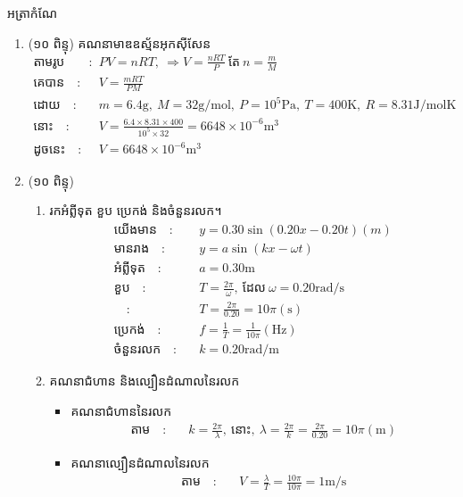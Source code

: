 \documentclass{classes/exam}
\begin{document}
{\kml អត្រាកំណែ}
\begin{enumerate}[I]
	\item {\color{magenta}\ks (១០ ពិន្ទុ)} គណនាមាឌឧស្ម័នអុកសុីសែន
	\begin{align*}
		\text{តាមរូបមន្ត}\quad :&\quad PV=nRT,~\Rightarrow V=\frac{nRT}{P}~\text{តែ}~ n=\frac{m}{M}\\
		\text{គេបាន}\quad :&\quad V=\frac{mRT}{PM}\\
		\text{ដោយ}\quad :&\quad m=6.4\si{\gram},~M=32\si{\gram/\mole},~P=10^{5}\si{\pascal},~T=400\si{\kelvin},~R=8.31\si{\joule/\mole\kelvin}\\
		\text{នោះ}\quad :&\quad V=\frac{6.4\times 8.31\times 400}{10^{5}\times 32}=6648\times 10^{-6}\si{\metre^{3}}\\
		\text{ដូចនេះ} \quad :&\quad V=6648\times 10^{-6}\si{\metre^{3}}
	\end{align*}
	\item {\color{magenta}\ks (១០ ពិន្ទុ)} 
	\begin{enumerate}[k]
		\item រកអំព្លីទុត ខួប ប្រេកង់ និងចំនួនរលក។
		\begin{align*}
			\text{យើងមាន}\quad :&\quad y=0.30\sin\left(0.20x-0.20t\right)\left(m\right)\\
			\text{មានរាង}\quad :&\quad y=a\sin\left(kx-\omega t\right)\\
			\text{អំព្លីទុត}\quad :&\quad a=0.30\si{\metre}\\
			\text{ខួប}\quad :&\quad T=\frac{2\pi}{\omega},~\text{ដែល}~\omega=0.20\si{\radian/\second}\\
			\quad :&\quad T=\frac{2\pi}{0.20}=10\pi\left(\si{\second}\right)\\
			\text{ប្រេកង់}\quad :&\quad f=\frac{1}{T}=\frac{1}{10\pi}\left(\si{\hertz}\right)\\
			\text{ចំនួនរលក}\quad :&\quad k=0.20\si{\radian/\metre} 
		\end{align*}
		\item គណនាជំហាន និងល្បឿនដំណាលនៃរលក
		\begin{itemize}
			\item គណនាជំហាននៃរលក
			\begin{align*}
				\text{តាម}\quad :&\quad k=\frac{2\pi}{\lambda},~\text{នោះ},~\lambda=\frac{2\pi}{k}=\frac{2\pi}{0.20}=10\pi\left(\si{\metre}\right)
			\end{align*}
			\item គណនាល្បឿនដំណាលនៃរលក
			\begin{align*}
				\text{តាម}\quad :&\quad V=\frac{\lambda}{T}=\frac{10\pi}{10\pi}=1\si{\metre/\second}

\end{align*}
\end{itemize}
\end{enumerate}
\end{enumerate}
\end{document}
